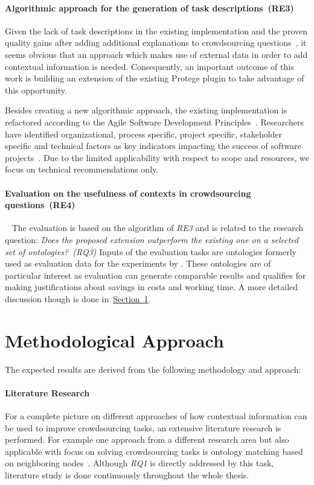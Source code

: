 \documentclass[12pt, notitlepage]{article}
\begin{document}
\paragraph{Algorithmic approach for the generation of task descriptions~(RE3)~}
Given the lack of task descriptions in the existing implementation and the proven quality gains after adding additional explanations to crowdsourcing questions~\cite{mortensen2013developing}, it seems obvious that an approach which makes use of external data in order to add contextual information is needed. Consequently, an important outcome of this work is building an extension of the existing Protege plugin to take advantage of this opportunity.

Besides creating a new algorithmic approach, the existing implementation is refactored according to the Agile Software Development Principles~\cite{martin2002agile}. Researchers have identified organizational, process specific, project specific, stakeholder specific and technical factors as key indicators impacting the success of software projects~\cite{chow2008survey}. Due to the limited applicability with respect to scope and resources, we focus on technical recommendations only. 
\paragraph{Evaluation on the usefulness of contexts in crowdsourcing questions~(RE4)}~
The evaluation is based on the algorithm of \emph{RE3} and is related to the research question: \emph{Does the proposed extension outperform the existing one on a selected set of ontologies?~(RQ3)} Inputs of the evaluation tasks are ontologies formerly used as evaluation data for the experiments by \citet{wohlgenannt2016crowd}. These ontologies are of particular interest as evaluation can generate comparable results and qualifies for making justifications about savings in costs and working time. A more detailed discussion though is done in~\hyperref[sec:methodology]{Section~\ref*{sec:methodology}}. 

\section{Methodological Approach}
\label{sec:methodology}
The expected results are derived from the following methodology and approach:
\paragraph{Literature Research}
For a complete picture on different approaches of how contextual information can be used to improve crowdsourcing tasks, an extensive literature research is performed. For example one approach from a different research area but also applicable with focus on solving crowdsourcing tasks is ontology matching based on neighboring nodes~\cite{hoffmann2010context}. Although \emph{RQ1} is directly addressed by this task, literature study is done continuously throughout the whole thesis. 
\end{document}
